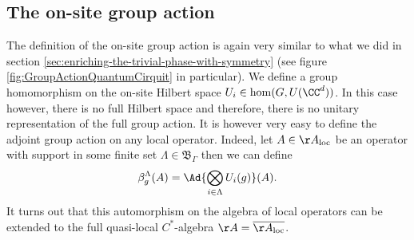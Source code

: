 \subsection{The on-site group action}
The definition of the on-site group action is again very similar to what we did in section \ref{sec:enriching-the-trivial-phase-with-symmetry} (see figure \ref{fig:GroupActionQuantumCirquit} in particular). We define a group homomorphism on the on-site Hilbert space $U_i\in\hom(G,U(\CC^d))$. In this case however, there is no full Hilbert space and therefore, there is no unitary representation of the full group action. It is however very easy to define the adjoint group action on any local operator. Indeed, let $A\in\AA_{\text{loc}}$ be an operator with support in some finite set $\Lambda\in\mathfrak{B}_{\Gamma}$ then we can define
\begin{equation}
\beta^\Lambda_{g}(A)=\Ad{\bigotimes_{i\in\Lambda}U_i(g)}(A).
\end{equation}
It turns out that this automorphism on the algebra of local operators can be extended to the full quasi-local $C^*$-algebra $\AA=\overline{\AA_{\text{loc}}}$.
